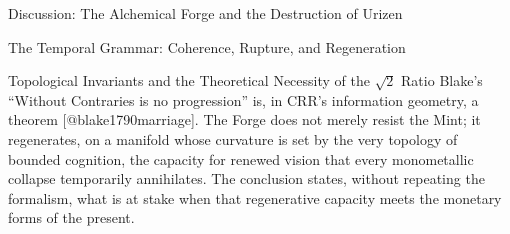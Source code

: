 \documentclass[
  ignorenonframetext,
]{beamer}
\begin{document}
\begin{frame}{Discussion: The Alchemical Forge and the Destruction of
Urizen}
\begin{block}{The Temporal Grammar: Coherence, Rupture, and
Regeneration}
\begin{block}{Topological Invariants and the Theoretical Necessity of
the \(\sqrt{2}\) Ratio}
Blake's ``Without Contraries is no progression'' is, in CRR's
information geometry, a theorem {[}@blake1790marriage{]}. The Forge does
not merely resist the Mint; it regenerates, on a manifold whose
curvature is set by the very topology of bounded cognition, the capacity
for renewed vision that every monometallic collapse temporarily
annihilates. The conclusion states, without repeating the formalism,
what is at stake when that regenerative capacity meets the monetary
forms of the present.
\end{block}
\end{block}
\end{frame}
\end{document}
